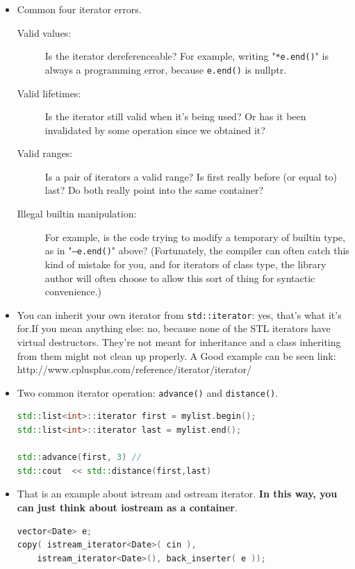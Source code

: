 \documentclass[a4paper,11pt,twoside]{book}
\begin{document}
\begin{itemize}
\item Common four iterator errors.
\begin{description}



	\item [Valid values:] Is the iterator dereferenceable? For example, writing "\texttt{*e.end()}" is always a programming error, because \texttt{e.end()} is nullptr.

	\item [Valid lifetimes:] Is the iterator still valid when it's being used? Or has it been invalidated by some operation since we obtained it?

	\item [Valid ranges:] Is a pair of iterators a valid range? Is first really before (or equal to) last? Do both really point into the same container?

	\item [Illegal builtin manipulation:] For example, is the code trying to modify a temporary of builtin type, as in "\texttt{--e.end()}" above? (Fortunately, the compiler can often catch this kind of mistake for you, and for iterators of class type, the library author will often choose to allow this sort of thing for syntactic convenience.)

\end{description}


	\item You can inherit your own iterator from \texttt{std::iterator}: yes, that's what it's for.If you mean anything else: no, because none of the STL iterators have virtual destructors. They're not meant for inheritance and a class inheriting from them might not clean up properly. A Good example can be seen link: \\ http://www.cplusplus.com/reference/iterator/iterator/

	\item Two common iterator operation:  \texttt{advance()} and \texttt{distance()}.
\begin{lstlisting}[frame=single, language=c++]
std::list<int>::iterator first = mylist.begin();
std::list<int>::iterator last = mylist.end();

std::advance(first, 3) //
std::cout  << std::distance(first,last)
\end{lstlisting}


	\item That is an example about istream and ostream iterator. \textbf{In this way, you can just think about iostream as a container}.
\begin{lstlisting}[frame=single, language=c++]
vector<Date> e;
copy( istream_iterator<Date>( cin ), 
	istream_iterator<Date>(), back_inserter( e ));


\end{lstlisting}
\end{itemize}
\end{document}
